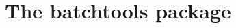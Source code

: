 \documentclass[10pt,compress,t,notes=noshow, xcolor=table]{beamer}
\begin{document}
\section{The batchtools package}



\end{document}
